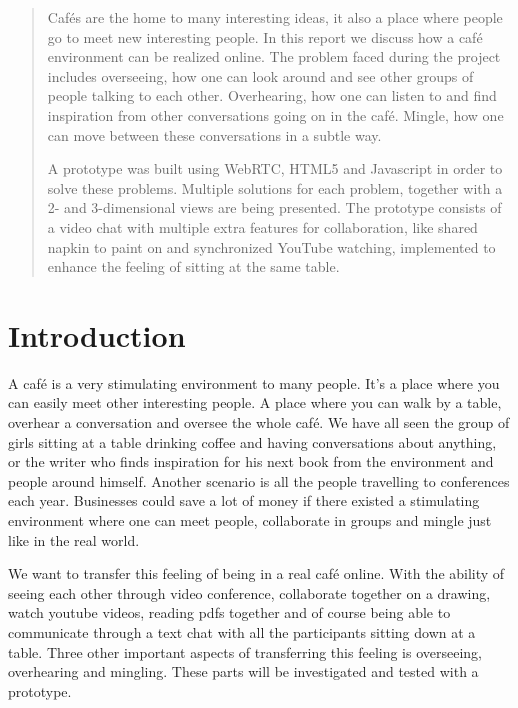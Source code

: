 \documentclass[12pt, titlepage]{article}
\begin{document}
\maketitle

\begin{abstract}
Cafés are the home to many interesting ideas, it also a place where people go to meet new interesting people. In this report we discuss how a café environment can be realized online. The problem faced during the project includes overseeing, how one can look around and see other groups of people talking to each other. Overhearing, how one can listen to and find inspiration from other conversations going on in the café. Mingle, how one can move between these conversations in a subtle way.

A prototype was built using WebRTC, HTML5 and Javascript in order to solve these problems. Multiple solutions for each problem, together with a 2- and 3-dimensional views are being presented. The prototype consists of a video chat with multiple extra features for collaboration, like shared napkin to paint on and  synchronized YouTube watching, implemented to enhance the feeling of sitting at the same table. 
\end{abstract}
\tableofcontents
\section{Introduction}
A café is a very stimulating environment to many people. It’s a place where you can easily meet other interesting people. A place where you can walk by a table, overhear a conversation and oversee the whole café. We have all seen the group of girls sitting at a table drinking coffee and having conversations about anything, or the writer who finds inspiration for his next book from the environment and people around himself. Another scenario is all the people travelling to conferences each year. Businesses could save a lot of money if there existed a stimulating environment where one can meet people, collaborate in groups and mingle just like in the real world.

We want to transfer this feeling of being in a real café online. With the ability of seeing each other through video conference, collaborate together on a drawing, watch youtube videos, reading pdfs together and of course being able to communicate through a text chat with all the participants sitting down at a table. Three other important aspects of transferring this feeling is overseeing, overhearing and mingling. These parts will be investigated and tested with a prototype.
\end{document}
